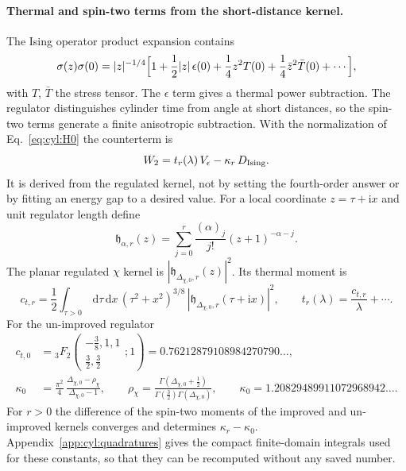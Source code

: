 \documentclass[11pt,a4paper]{article}
\numberwithin{equation}{section}
\newcommand{\dd}{\,\mathrm d}
\begin{document}
\paragraph{Thermal and spin-two terms from the short-distance kernel.} The Ising operator product expansion contains
\begin{equation}
 \sigma(z)\sigma(0)=|z|^{-1/4}\Bigl[1+\frac12|z|\,\epsilon(0)+\frac14z^2T(0)+\frac14\bar z^2\bar T(0)+\cdots\Bigr],
\end{equation}
with $T$, $\bar T$ the stress tensor. The $\epsilon$ term gives a thermal power subtraction. The regulator distinguishes
cylinder time from angle at short distances, so the spin-two terms generate a finite anisotropic subtraction. With the
normalization of Eq.~\eqref{eq:cyl:H0} the counterterm is
\begin{equation}
 W_2=t_r(\lambda)\,V_\epsilon-\kappa_r\,D_{\rm Ising}.
 \label{eq:cyl:W2}
\end{equation}
It is derived from the regulated kernel, not by setting the fourth-order answer or by fitting an energy gap to a
desired value. For a local coordinate $z=\tau+\mathrm ix$ and unit regulator length define
\begin{equation}
 \mathfrak h_{\alpha,r}(z)=\sum_{j=0}^r\frac{(\alpha)_j}{j!}(z+1)^{-\alpha-j}.
\end{equation}
The planar regulated $\chi$ kernel is $|\mathfrak h_{\Delta_{\chi,0},r}(z)|^2$. Its thermal moment is
\begin{equation}
 c_{t,r}=\frac12\int_{\tau>0}\dd\tau\dd x\,(\tau^2+x^2)^{3/8}\,|\mathfrak h_{\Delta_{\chi,0},r}(\tau+\mathrm ix)|^2,
 \qquad t_r(\lambda)=\frac{c_{t,r}}{\lambda}+\cdots.
\end{equation}
For the un-improved regulator
\begin{equation}
\begin{aligned}
 c_{t,0}&={}_3F_2\!\left(\begin{matrix}-\frac38,1,1\\[1pt]\frac32,\frac32\end{matrix};1\right)=0.76212879108984270790\ldots,\\
 \kappa_0&=\frac{\pi^2}{4}\,\frac{\Delta_{\chi,0}-\rho_\chi}{\Delta_{\chi,0}-1},\qquad
 \rho_\chi=\frac{\Gamma(\Delta_{\chi,0}+\frac12)}{\Gamma(\frac32)\Gamma(\Delta_{\chi,0})},\qquad
 \kappa_0=1.20829489911072968942\ldots.
\end{aligned}
\end{equation}
For $r>0$ the difference of the spin-two moments of the improved and un-improved kernels converges and determines
$\kappa_r-\kappa_0$. Appendix~\ref{app:cyl:quadratures} gives the compact finite-domain integrals used for these
constants, so that they can be recomputed without any saved number.
\end{document}
